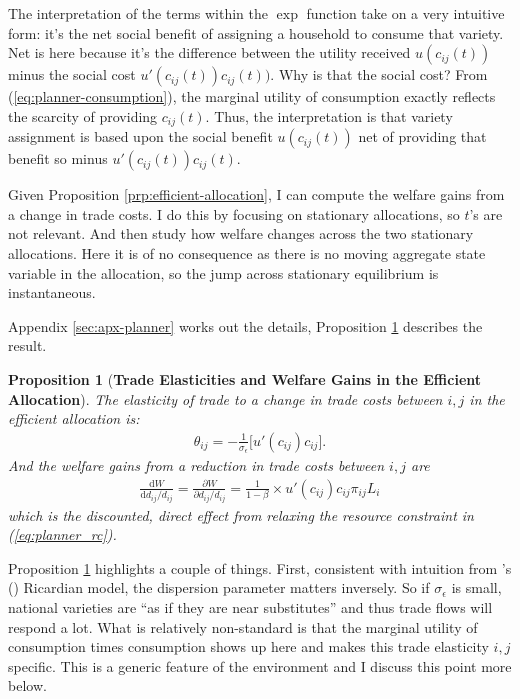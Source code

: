 \documentclass[12pt,pdftex]{article}
\newtheorem{prp}{Proposition}
\def\citeapos#1{\citeauthor{#1}'s (\citeyear{#1})}
\begin{document}
\begin{onehalfspacing}
The interpretation of the terms within the $\exp$ function take on a very intuitive form: it's the net social benefit of assigning a household to consume that variety. Net is here because it's the difference between the utility received $u(c_{ij}(t))$ minus the social cost $u'(c_{ij}(t))c_{ij}(t))$. Why is that the social cost? From (\ref{eq:planner-consumption}), the marginal utility of consumption exactly reflects the scarcity of providing $c_{ij}(t)$. Thus, the interpretation is that variety assignment is based upon the social benefit $u(c_{ij}(t))$ net of providing that benefit so minus $u'(c_{ij}(t))c_{ij}(t)$.

Given Proposition \ref{prp:efficient-allocation}, I can compute the welfare gains from a change in trade costs. I do this by focusing on stationary allocations, so $t$'s are not relevant. And then study how welfare changes across the two stationary allocations. Here it is of no consequence as there is no moving aggregate state variable in the allocation, so the jump across stationary equilibrium is instantaneous.

Appendix \ref{sec:apx-planner} works out the details, Proposition \ref{prp:gains-efficient-allocation} describes the result.

\begin{prp}[\textbf{Trade Elasticities and Welfare Gains in the Efficient Allocation}]\label{prp:gains-efficient-allocation} The elasticity of trade to a change in trade costs between $i,j$ in the efficient allocation is:
\begin{align}
\theta_{ij} =  -\frac{1}{\sigma_{\epsilon}} \bigg [ u'(c_{ij}) c_{ij} \bigg]. \label{eq:eff-trade-elasticity}
\end{align}
And the welfare gains from a reduction in trade costs between $i,j$ are
\begin{align}
\frac{\mathrm{d} W}{\mathrm{d} d_{ij} / d_{ij}} = \frac{\partial W}{\partial d_{ij} / d_{ij}} = \frac{1}{1-\beta} \times u'(c_{ij}) c_{ij} \pi_{ij} L_i
\label{eq:eff-trade-gains}
\end{align}
which is the discounted, direct effect from relaxing the resource constraint in (\ref{eq:planner_rc}).
\end{prp}
Proposition \ref{prp:gains-efficient-allocation} highlights a couple of things. First, consistent with intuition from \citeapos{eaton2002technology} Ricardian model, the dispersion parameter matters inversely. So if $\sigma_{\epsilon}$ is small, national varieties are ``as if they are near substitutes'' and thus trade flows will respond a lot. What is relatively non-standard is that the marginal utility of consumption times consumption shows up here and makes this trade elasticity $i,j$ specific. This is a generic feature of the environment and I discuss this point more below.


\end{onehalfspacing}
\end{document}

